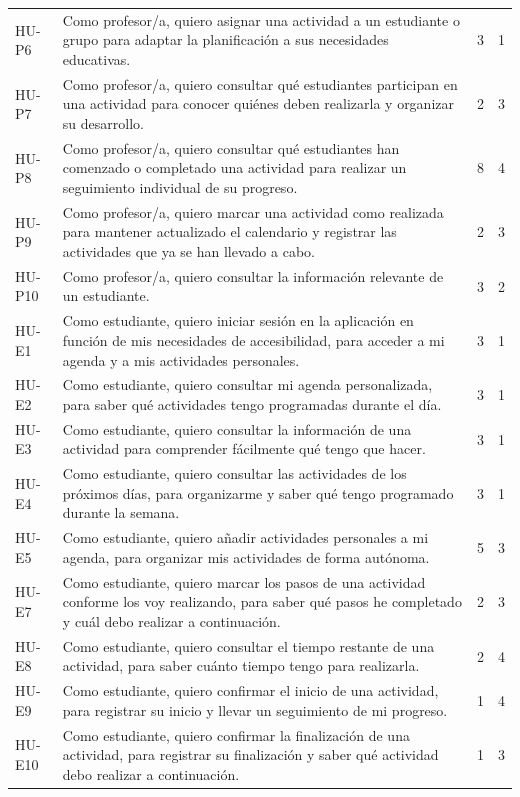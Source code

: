 \begin{xltabular}{\textwidth}{p{1.8cm} X p{1.3cm} p{1.1cm}}
HU-P6 & Como profesor/a, quiero asignar una actividad a un estudiante o grupo para adaptar la planificación a sus necesidades educativas.~ & 3 & 1 \\
HU-P7 & Como profesor/a, quiero consultar qué estudiantes participan en una actividad para conocer quiénes deben realizarla y organizar su desarrollo.~ & 2 & 3 \\
HU-P8 & Como profesor/a, quiero consultar qué estudiantes han comenzado o completado una actividad para realizar un seguimiento individual de su progreso.~ & 8 & 4 \\
HU-P9 & Como profesor/a, quiero marcar una actividad como realizada para mantener actualizado el calendario y registrar las actividades que ya se han llevado a cabo.~ & 2 & 3 \\
HU-P10 & Como profesor/a, quiero consultar la información relevante de un estudiante. & 3 & 2 \\
HU-E1 & Como estudiante, quiero iniciar sesión en la aplicación en función de mis necesidades de accesibilidad, para acceder a mi agenda y a mis actividades personales.~ & 3 & 1 \\
HU-E2 & Como estudiante, quiero consultar mi agenda personalizada, para saber qué actividades tengo programadas durante el día. & 3 & 1 \\
HU-E3 & Como estudiante, quiero consultar la información de una actividad para comprender fácilmente qué tengo que hacer.~ & 3 & 1 \\
HU-E4 & Como estudiante, quiero consultar las actividades de los próximos días, para organizarme y saber qué tengo programado durante la semana.~ & 3 & 1 \\
HU-E5 & Como estudiante, quiero añadir actividades personales a mi agenda, para organizar mis actividades de forma autónoma.~ & 5 & 3 \\
HU-E7 & Como estudiante, quiero marcar los pasos de una actividad conforme los voy realizando, para saber qué pasos he completado y cuál debo realizar a continuación. & 2 & 3 \\
HU-E8 & Como estudiante, quiero consultar el tiempo restante de una actividad, para saber cuánto tiempo tengo para realizarla.~ & 2 & 4 \\
HU-E9 & Como estudiante, quiero confirmar el inicio de una actividad, para registrar su inicio y llevar un seguimiento de mi progreso.~ & 1 & 4 \\
HU-E10 & Como estudiante, quiero confirmar la finalización de una actividad, para registrar su finalización y saber qué actividad debo realizar a continuación.~ & 1 & 3 \\

\end{xltabular}
